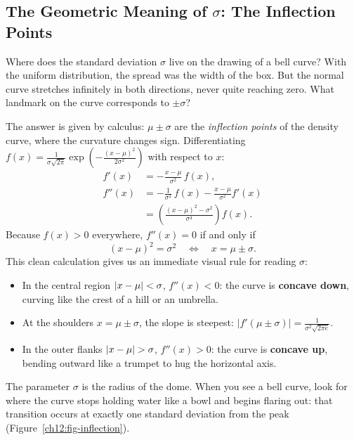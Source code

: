 \subsection{The Geometric Meaning of $\sigma$: The Inflection Points}
\label{ch12:inflection}

Where does the standard deviation $\sigma$ live on the drawing of a bell curve?
With the uniform distribution, the spread was the width of the box. But the normal curve stretches infinitely in both directions, never quite reaching zero. What landmark on the curve corresponds to $\pm \sigma$?

The answer is given by calculus: $\mu \pm \sigma$ are the \emph{inflection points} of the density curve, where the curvature changes sign. Differentiating $f(x) = \frac{1}{\sigma\sqrt{2\pi}}\exp\left(-\frac{(x-\mu)^2}{2\sigma^2}\right)$ with respect to $x$:
\begin{align*}
  f'(x) &= -\frac{x-\mu}{\sigma^2}\,f(x), \\
  f''(x) &= -\frac{1}{\sigma^2}\,f(x) - \frac{x-\mu}{\sigma^2} f'(x) \\
         &= \left(\frac{(x-\mu)^2 - \sigma^2}{\sigma^4}\right) f(x).
\end{align*}
Because $f(x) > 0$ everywhere, $f''(x) = 0$ if and only if
\[
  (x - \mu)^2 = \sigma^2 \quad\Longleftrightarrow\quad x = \mu \pm \sigma.
\]
This clean calculation gives us an immediate visual rule for reading $\sigma$:
\begin{itemize}
  \item In the central region $\lvert x - \mu\rvert < \sigma$, $f''(x) < 0$: the curve is \textbf{concave down}, curving like the crest of a hill or an umbrella.
  \item At the shoulders $x = \mu \pm \sigma$, the slope is steepest: $|f'(\mu \pm \sigma)| = \frac{1}{\sigma^2 \sqrt{2\pi e}}$.
  \item In the outer flanks $\lvert x - \mu\rvert > \sigma$, $f''(x) > 0$: the curve is \textbf{concave up}, bending outward like a trumpet to hug the horizontal axis.
\end{itemize}
The parameter $\sigma$ is the radius of the dome. When you see a bell curve, look for where the curve stops holding water like a bowl and begins flaring out: that transition occurs at exactly one standard deviation from the peak (Figure~\ref{ch12:fig-inflection}).

